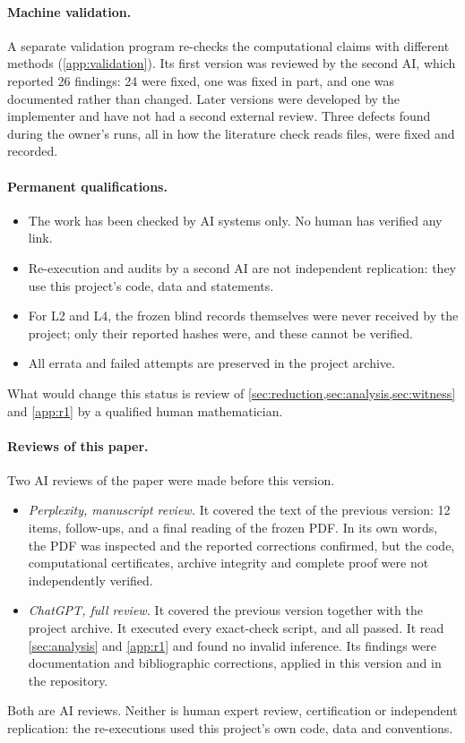 \documentclass[11pt]{article}
\theoremstyle{plain}
\theoremstyle{definition}
\theoremstyle{remark}
\begin{document}
\paragraph{Machine validation.}
A separate validation program re-checks the computational claims with different methods (\cref{app:validation}). Its first version was reviewed by the second AI, which reported 26 findings: 24 were fixed, one was fixed in part, and one was documented rather than changed. Later versions were developed by the implementer and have not had a second external review. Three defects found during the owner's runs, all in how the literature check reads files, were fixed and recorded.

\paragraph{Permanent qualifications.}
\begin{itemize}
  \item The work has been checked by AI systems only. No human has verified any link.
  \item Re-execution and audits by a second AI are not independent replication: they use this project's code, data and statements.
  \item For L2 and L4, the frozen blind records themselves were never received by the project; only their reported hashes were, and these cannot be verified.
  \item All errata and failed attempts are preserved in the project archive.
\end{itemize}
What would change this status is review of \cref{sec:reduction,sec:analysis,sec:witness} and \cref{app:r1} by a qualified human mathematician.

\paragraph{Reviews of this paper.} Two AI reviews of the paper were made before this version.
\begin{itemize}
  \item \emph{Perplexity, manuscript review.} It covered the text of the previous version: 12 items, follow-ups, and a final reading of the frozen PDF. In its own words, the PDF was inspected and the reported corrections confirmed, but the code, computational certificates, archive integrity and complete proof were not independently verified.
  \item \emph{ChatGPT, full review.} It covered the previous version together with the project archive. It executed every exact-check script, and all passed. It read \cref{sec:analysis} and \cref{app:r1} and found no invalid inference. Its findings were documentation and bibliographic corrections, applied in this version and in the repository.
\end{itemize}
Both are AI reviews. Neither is human expert review, certification or independent replication: the re-executions used this project's own code, data and conventions.
\end{document}

